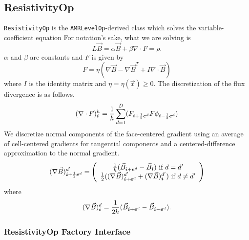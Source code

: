 \newcommand{\vb}{\vec B}
\newcommand{\vx}{\vec x}

\subsection{ResistivityOp}


{\tt ResistivityOp} is the {\tt AMRLevelOp}-derived class which solves
the variable-coefficient equation
For notation's sake, what we are solving is
$$
L \vb = \alpha \vb + \beta \nabla \cdot F = \rho.
$$
$\alpha$ and $\beta$ are constants and $F$ is given by 
$$
F = \eta(\nabla \vb - \nabla \vb^T +  I \nabla \cdot \vb)
$$
where $I$ is the identity matrix and $\eta = \eta(\vx) \ge 0$.
The discretization of the flux divergence is as follows.
$$
(\nabla \cdot F)^h_{\boldsymbol{i}} = \frac{1}{h}\sum\limits^D_{d=1} 
(F_{{\boldsymbol{i}}+\frac{1}{2} {\boldsymbol{e}}^d}  F\phi_{{\boldsymbol{i}}-\frac{1}{2} {\boldsymbol{e}}^d})
$$
We discretize normal components of the face-centered gradient  using 
an average of cell-centered gradients for tangential components and a
centered-difference approximation to the normal gradient.
$$
(\nabla \vb)^{d'}_{\ibold + \half \ebold^d} = \left( \begin{array}{c}
                      \frac{1}{h}(\vb_{\ibold+ \ebold^d}  -\vb_{\ibold})  \mbox{ if } d = d'\\
                      \frac{1}{2}((\nabla \vb)^{d'}_{\ibold+\ebold^d}  +
                      (\nabla \vb)^{d'}_{\ibold})  \mbox{ if } d \neq d'
                      \end{array}
                      \right)
$$
where 
$$
(\nabla \vb)^{d}_{\ibold} = \frac{1}{2 h}(\vb_{\ibold + \ebold^d} - \vb_{\ibold - \ebold^d}).
$$

\subsubsection{ResistivityOp Factory Interface}


